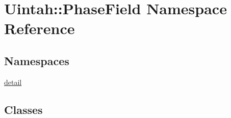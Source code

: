 \hypertarget{namespaceUintah_1_1PhaseField}{}\section{Uintah\+:\+:Phase\+Field Namespace Reference}
\label{namespaceUintah_1_1PhaseField}
\subsection*{Namespaces}
\begin{DoxyCompactItemize}
\item 
 \hyperlink{namespaceUintah_1_1PhaseField_1_1detail}{detail}
\end{DoxyCompactItemize}
\subsection*{Classes}
